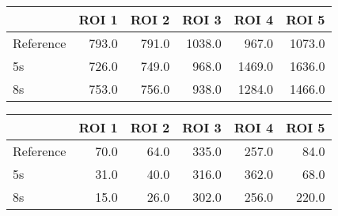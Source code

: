 \begin{tabular}{lrrrrr}
\toprule
{} &  ROI 1 &  ROI 2 &   ROI 3 &   ROI 4 &   ROI 5 \\
\midrule
Reference &  793.0 &  791.0 &  1038.0 &   967.0 &  1073.0 \\
5s        &  726.0 &  749.0 &   968.0 &  1469.0 &  1636.0 \\
8s        &  753.0 &  756.0 &   938.0 &  1284.0 &  1466.0 \\
\bottomrule
\end{tabular}
\begin{tabular}{lrrrrr}
\toprule
{} &  ROI 1 &  ROI 2 &  ROI 3 &  ROI 4 &  ROI 5 \\
\midrule
Reference &   70.0 &   64.0 &  335.0 &  257.0 &   84.0 \\
5s        &   31.0 &   40.0 &  316.0 &  362.0 &   68.0 \\
8s        &   15.0 &   26.0 &  302.0 &  256.0 &  220.0 \\
\bottomrule
\end{tabular}
